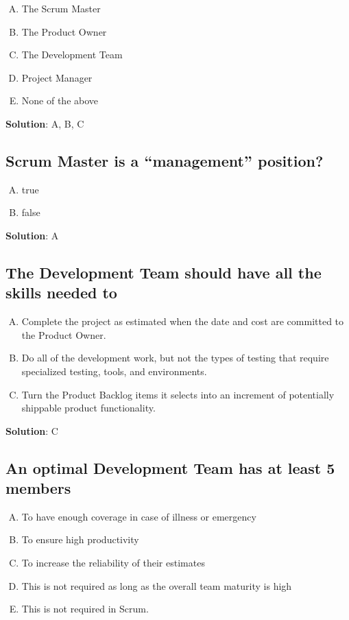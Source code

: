 \begin{enumerate}[A)]
  \item The Scrum Master
  \item The Product Owner
  \item The Development Team
  \item Project Manager
  \item None of the above
\end{enumerate}


\textbf{Solution}: A, B, C


\subsection{Scrum Master is a \enquote{management} position?}
\begin{enumerate}[A)]
  \item true
  \item false
\end{enumerate}


\textbf{Solution}: A


\subsection{The Development Team should have all the skills needed to}
\begin{enumerate}[A)]
  \item Complete the project as estimated when the date and cost are committed to the Product Owner.
  \item Do all of the development work, but not the types of testing that require specialized testing, tools, and environments.
  \item Turn the Product Backlog items it selects into an increment of potentially shippable product functionality.
\end{enumerate}


\textbf{Solution}: C


\subsection{An optimal Development Team has at least 5 members}
\begin{enumerate}[A)]
  \item To have enough coverage in case of illness or emergency
  \item To ensure high productivity
  \item To increase the reliability of their estimates
  \item This is not required as long as the overall team maturity is high
  \item This is not required in Scrum.
\end{enumerate}


